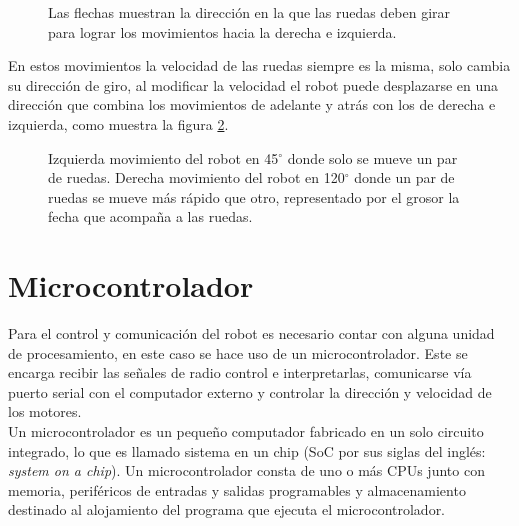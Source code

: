 \documentclass{iccmemoria}
\begin{document}
\begin{figure}[H]
  \centering
  \begin{footnotesize}
  
  \end{footnotesize}
  \caption[Movimiento hacia la derecha e izquierda del robot omnidireccional.]{Las flechas muestran la dirección en la que las ruedas deben girar para lograr los movimientos hacia la derecha e izquierda.}
  \label{fig:omni_movement_left_right}
\end{figure}

En estos movimientos la velocidad de las ruedas siempre es la misma, solo cambia su dirección de giro, al modificar la velocidad el robot puede desplazarse en una dirección que combina los movimientos de adelante y atrás con los de derecha e izquierda, como muestra la figura \ref{fig:omni_movement_combined}.

\begin{figure}[H]
  \centering
  \begin{footnotesize}
  
  \end{footnotesize}
  \caption[Movimiento en 45$^{\circ}$ y 120$^{\circ}$ del robot omnidireccional]{Izquierda movimiento del robot en 45$^{\circ}$ donde solo se mueve un par de ruedas. Derecha movimiento del robot en 120$^{\circ}$ donde un par de ruedas se mueve más rápido que otro, representado por el grosor la fecha que acompaña a las ruedas.}
  \label{fig:omni_movement_combined}
\end{figure}

\section{Microcontrolador}

Para el control y comunicación del robot es necesario contar con alguna unidad de procesamiento, en este caso se hace uso de un microcontrolador. Este se encarga recibir las señales de radio control e interpretarlas, comunicarse vía puerto serial con el computador externo y controlar la dirección y velocidad de los motores.\\

Un microcontrolador es un pequeño computador fabricado en un solo circuito integrado, lo que es llamado sistema en un chip (SoC por sus siglas del inglés: \emph{system on a chip}). Un microcontrolador consta de uno o más CPUs junto con memoria, periféricos de entradas y salidas programables y almacenamiento destinado al alojamiento del programa que ejecuta el microcontrolador.\\
\end{document}
